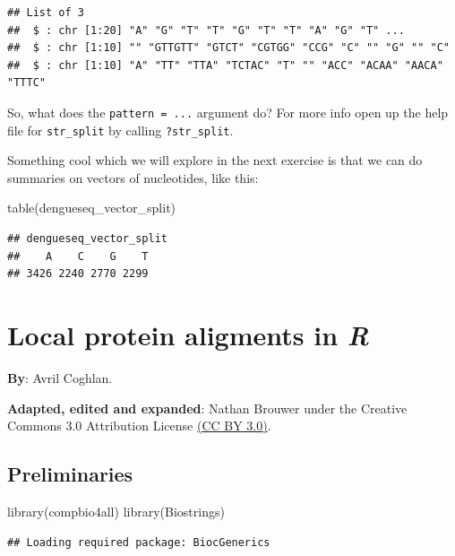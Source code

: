 \documentclass[
]{book}
\newenvironment{Shaded}{\begin{snugshade}}{\end{snugshade}}
\newcommand{\FunctionTok}[1]{\textcolor[rgb]{0.00,0.00,0.00}{#1}}
\newcommand{\NormalTok}[1]{#1}
\begin{document}
\begin{verbatim}
## List of 3
##  $ : chr [1:20] "A" "G" "T" "T" "G" "T" "T" "A" "G" "T" ...
##  $ : chr [1:10] "" "GTTGTT" "GTCT" "CGTGG" "CCG" "C" "" "G" "" "C"
##  $ : chr [1:10] "A" "TT" "TTA" "TCTAC" "T" "" "ACC" "ACAA" "AACA" "TTTC"
\end{verbatim}

So, what does the \texttt{pattern\ =\ ...} argument do? For more info open up the help file for \texttt{str\_split} by calling \texttt{?str\_split}.

Something cool which we will explore in the next exercise is that we can do summaries on vectors of nucleotides, like this:

\begin{Shaded}
\begin{Highlighting}[]
\FunctionTok{table}\NormalTok{(dengueseq\_vector\_split)}
\end{Highlighting}
\end{Shaded}

\begin{verbatim}
## dengueseq_vector_split
##    A    C    G    T 
## 3426 2240 2770 2299
\end{verbatim}

\hypertarget{local-protein-aligments-in-r}{%
\chapter{\texorpdfstring{Local protein aligments in \emph{R}}{Local protein aligments in R}}\label{local-protein-aligments-in-r}}

\textbf{By}: Avril Coghlan.

\textbf{Adapted, edited and expanded}: Nathan Brouwer under the Creative Commons 3.0 Attribution License \href{https://creativecommons.org/licenses/by/3.0/}{(CC BY 3.0)}.

\hypertarget{preliminaries-3}{%
\section{Preliminaries}\label{preliminaries-3}}

\begin{Shaded}
\begin{Highlighting}[]
\FunctionTok{library}\NormalTok{(compbio4all)}
\FunctionTok{library}\NormalTok{(Biostrings)}
\end{Highlighting}
\end{Shaded}

\begin{verbatim}
## Loading required package: BiocGenerics
\end{verbatim}
\end{document}
